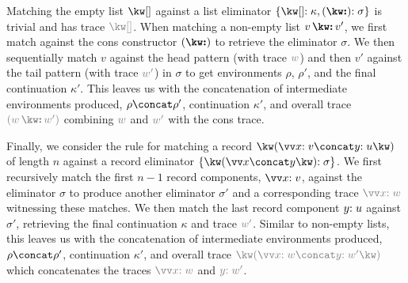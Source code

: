 Matching the empty list $\exNil$ against a list eliminator $\elimList{\kappa}{\sigma}$ is trivial and has trace $\textcolor{gray}{\exNil}$. When matching a non-empty list $\exCons{v}{v'}$, we first match against the cons constructor $(\symCons)$ to retrieve the eliminator $\sigma$. We then sequentially match $v$ against the head pattern (with trace $\textcolor{gray}{w}$) and then $v'$ against the tail pattern (with trace $\textcolor{gray}{w'}$) in $\sigma$ to get environments $\rho$, $\rho'$, and the final continuation $\kappa'$. This leaves us with the concatenation of intermediate environments produced, $\rho \concat \rho'$, continuation $\kappa'$, and overall trace $\textcolor{gray}{(\exCons{w}{w'})}$ combining $\textcolor{gray}{w}$ and $\textcolor{gray}{w'}$ with the cons trace.

Finally, we consider the rule for matching a record $\exRec{\vec{\bind{x}{v}} \concat \bind{y}{u}}$ of length $n$ against a record eliminator $\elimRec{\vec{x} \concat y}{\sigma}$. We first recursively match the first $n - 1$ record components, $\vec{\bind{x}{v}}$, against the eliminator $\sigma$ to produce another eliminator $\sigma'$ and a corresponding trace $\textcolor{gray}{\vec{\bind{x}{w}}}$ witnessing these matches. We then match the last record component $y{:}\;u$ against $\sigma'$, retrieving the final continuation $\kappa$ and trace $\textcolor{gray}{w'}$. Similar to non-empty lists, this leaves us with the concatenation of intermediate environments produced, $\rho \concat \rho'$, continuation $\kappa'$, and overall trace $\textcolor{gray}{\exRec{\vec{\bind{x}{w}} \concat \bind{y}{w'}}}$ which concatenates the traces $\textcolor{gray}{\vec{\bind{x}{w}}}$ and $\textcolor{gray}{\bind{y}{w'}}$. 


